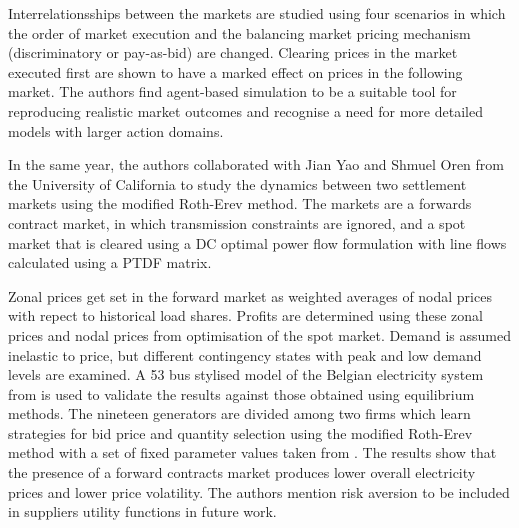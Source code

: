 Interrelationsships between the markets are studied using four scenarios in
which the order of market execution and the balancing market pricing mechanism
(discriminatory or pay-as-bid) are changed.  Clearing prices in the market
executed first are shown to have a marked effect on prices in the
following market.  The authors find agent-based simulation to be a suitable
tool for reproducing realistic market outcomes and recognise a need for more
detailed models with larger action domains.

In the same year, the authors collaborated with Jian Yao and Shmuel Oren from
the University of California to study the dynamics between two settlement
markets using the modified Roth-Erev method.  The markets are a forwards
contract market, in which transmission constraints are ignored, and a spot
market that is cleared using a DC optimal power flow formulation with line
flows calculated using a PTDF matrix.

Zonal prices get set in the forward market as weighted averages of nodal prices
with repect to historical load shares.  Profits are determined using these
zonal prices and nodal prices from optimisation of the spot market.  Demand is assumed
inelastic to price, but different contingency states with peak and low demand
levels are examined.  A 53 bus stylised model of the Belgian electricity
system from \cite{yao:07,yao:08} is used to validate the results against those
obtained using equilibrium methods.  The nineteen generators are divided among
two firms which learn strategies for bid price and quantity selection using the
modified Roth-Erev method with a set of fixed parameter values taken from
\cite{roth:aer}.  The results show that the presence of a forward contracts
market produces lower overall electricity prices and lower price volatility.
The authors mention risk aversion to be included in suppliers utility
functions in future work.


